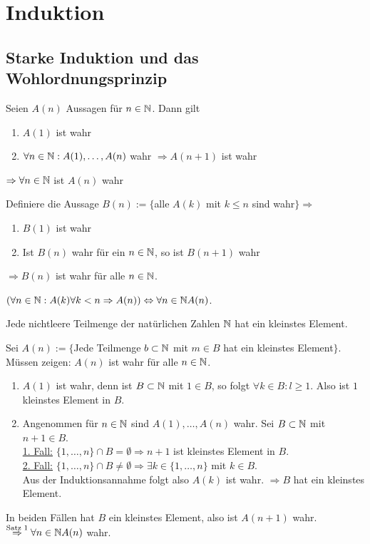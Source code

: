 \documentclass[../ana1.tex]{subfiles}
\begin{document}
\setcounter{section}{4}
\section{Induktion}
\subsection{Starke Induktion und das Wohlordnungsprinzip}
\begin{satz}
	Seien \(A(n)\) Aussagen für \(n\in\mathbb{N} \). Dann gilt
	\begin{enumerate}
		\item \(A(1)\) ist wahr
		\item \(\forall n\in\mathbb{N}: A(1), \ldots, A(n)\) wahr \(\Rightarrow A(n+1)\) ist wahr
	\end{enumerate}
	\(\Rightarrow \forall n\in\mathbb{N} \) ist \(A(n)\) wahr
\end{satz}
\begin{bew}
	Definiere die Aussage \(B(n) := \{ \)alle \(A(k)\) mit \(k\leq n\) sind wahr\( \}\Rightarrow \)
	\begin{enumerate}
		\item \(B(1)\) ist wahr
		\item Ist \(B(n)\) wahr für ein \(n\in\mathbb{N} \), so ist \(B(n+1)\) wahr
	\end{enumerate}
	\(\Rightarrow B(n)\) ist wahr für alle \(n\in\mathbb{N} \).
\end{bew}
\begin{bem}
	\((\forall n\in\mathbb{N}:A(k) \forall k<n \Rightarrow A(n)) \Leftrightarrow \forall n\in\mathbb{N} A(n)\).
\end{bem}
\begin{satz}
	Jede nichtleere Teilmenge der natürlichen Zahlen \(\mathbb{N} \) hat ein kleinstes Element.
\end{satz}
\begin{bew}
	Sei \(A(n):= \{ \)Jede Teilmenge \(b\subset\mathbb{N} \) mit \(m\in B\) hat ein kleinstes Element\( \} \).\\
	Müssen zeigen: \(A(n)\) ist wahr für alle \(n\in\mathbb{N} \).
	\begin{enumerate}
		\item \(A(1)\) ist wahr, denn ist \(B\subset \mathbb{N} \) mit \(1\in B\), so folgt \(\forall k \in B: l\geq 1\). Also ist \(1\) kleinstes Element in \(B\).
		\item Angenommen für \(n\in\mathbb{N} \) sind \(A(1),\ldots,A(n)\) wahr. Sei \(B\subset \mathbb{N} \) mit \(n+1\in B\).\\
		      \underline{1. Fall:} \( \{1,\ldots,n\}\cap B = \emptyset \Rightarrow n+1\) ist kleinstes Element in \(B\).\\
		      \underline{2. Fall:} \( \{1,\ldots,n\} \cap B \neq \emptyset \Rightarrow \exists k\in \{1,\ldots,n\} \) mit \(k\in B\).\\
		      Aus der Induktionsannahme folgt also \(A(k)\) ist wahr. \(\Rightarrow B\) hat ein kleinstes Element.
	\end{enumerate}
	In beiden Fällen hat \(B\) ein kleinstes Element, also ist \(A(n+1)\) wahr.\\
	\(\overset{\text{Satz 1}}{\Rightarrow} \forall n\in \mathbb{N} A(n)\) wahr.
\end{bew}
\end{document}
